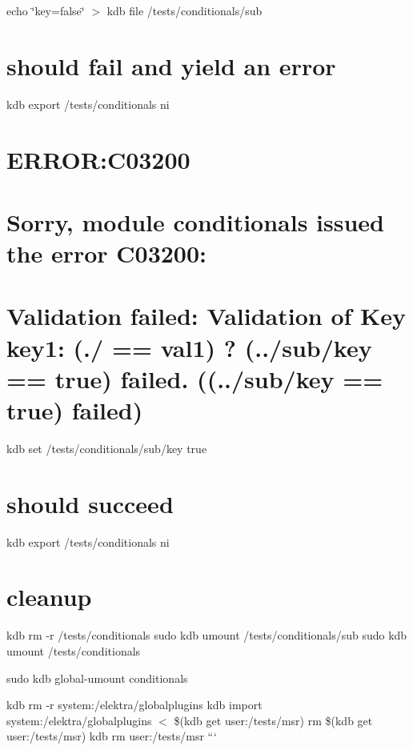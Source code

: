 echo \char`\"{}key=false\char`\"{} $>$ {\ttfamily kdb file /tests/conditionals/sub}\hypertarget{autotoc_md84_autotoc_md96}{}\section{should fail and yield an error}\label{autotoc_md84_autotoc_md96}
kdb export /tests/conditionals ni \hypertarget{autotoc_md84_autotoc_md97}{}\section{E\+R\+R\+O\+R\+:\+C03200}\label{autotoc_md84_autotoc_md97}
\hypertarget{autotoc_md84_autotoc_md98}{}\section{Sorry, module conditionals issued the error C03200\+:}\label{autotoc_md84_autotoc_md98}
\hypertarget{autotoc_md84_autotoc_md99}{}\section{Validation failed\+: Validation of Key key1\+: (./ == \textquotesingle{}val1\textquotesingle{}) ? (../sub/key == \textquotesingle{}true\textquotesingle{}) failed. ((../sub/key == \textquotesingle{}true\textquotesingle{}) failed)}\label{autotoc_md84_autotoc_md99}
kdb set /tests/conditionals/sub/key true\hypertarget{autotoc_md84_autotoc_md100}{}\section{should succeed}\label{autotoc_md84_autotoc_md100}
kdb export /tests/conditionals ni\hypertarget{autotoc_md84_autotoc_md101}{}\section{cleanup}\label{autotoc_md84_autotoc_md101}
kdb rm -\/r /tests/conditionals sudo kdb umount /tests/conditionals/sub sudo kdb umount /tests/conditionals

sudo kdb global-\/umount conditionals

kdb rm -\/r system\+:/elektra/globalplugins kdb import system\+:/elektra/globalplugins $<$ \$(kdb get user\+:/tests/msr) rm \$(kdb get user\+:/tests/msr) kdb rm user\+:/tests/msr ``` 